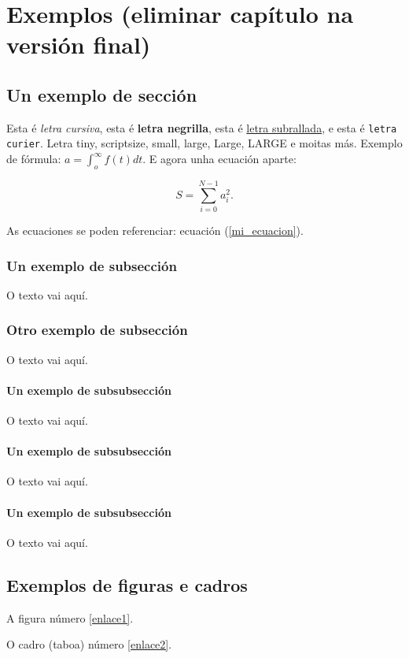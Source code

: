 \chapter{Exemplos (eliminar capítulo na versión final)}

\section{Un exemplo de sección}
Esta é {\it letra cursiva}, esta é {\bf letra negrilla}, esta é \underline{letra subrallada}, e esta é {\tt letra curier}. Letra {\tiny tiny}, {\scriptsize scriptsize}, {\small small}, {\large large}, {\Large Large}, {\LARGE LARGE} e moitas más. Exemplo de fórmula: $a=\int_o^\infty f(t)dt$.  E agora unha ecuación aparte:

\begin{equation}
S=\sum_{i=0}^{N-1} a_i^2 .
\label{mi_ecuacion}
\end{equation}

As ecuaciones se poden referenciar: ecuación (\ref{mi_ecuacion}).

\subsection{Un exemplo de subsección}
O texto vai aquí.
\subsection{Otro exemplo de subsección}
O texto vai aquí.
\subsubsection{Un exemplo de subsubsección}
O texto vai aquí.
\subsubsection{Un exemplo de subsubsección}
O texto vai aquí.
\subsubsection{Un exemplo de subsubsección}
O texto vai aquí.
\section{Exemplos de figuras e cadros}

A figura número \ref{enlace1}.

O cadro (taboa) número \ref{enlace2}.

